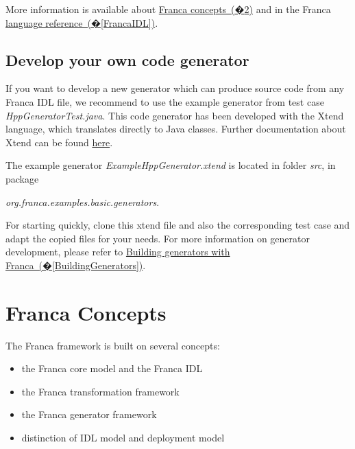 \documentclass[a4paper,10pt]{scrreprt}
\newlength{\XdocItemIndent}
\begin{document}
More information is available about \hyperref[FrancaConcepts]{Franca concepts~(�\ref*{FrancaConcepts})}
and in the Franca \hyperref[FrancaIDL]{language reference~(�\ref*{FrancaIDL})}.

\section{Develop your own code generator}
\label{GettingStarted_DevelopCodegenerator}
If you want to develop a new generator which can produce source code from any 
Franca IDL file, we recommend to use the example generator from test case
\textit{HppGeneratorTest.java}. This code generator has been developed with the 
Xtend language, which translates directly to Java classes.
Further documentation about Xtend can be found \href{http://www.xtend-lang.org}{here}.

The example generator \textit{ExampleHppGenerator.xtend} is located in folder \textit{src},
in package

\textit{org.franca.examples.basic.generators}.

For starting quickly, clone this xtend file and also the corresponding test case
and adapt the copied files for your needs.
For more information on generator development, please refer to
\hyperref[BuildingGenerators]{Building generators with Franca~(�\ref*{BuildingGenerators})}.


\chapter{Franca Concepts}
\label{FrancaConcepts}
The Franca framework is built on several concepts:
\setlength{\XdocItemIndent}{\textwidth}
\begin{itemize}
\addtolength{\XdocItemIndent}{-2.5em}
\item \begin{minipage}[t]{\XdocItemIndent}
the Franca core model and the Franca IDL

\end{minipage}
\item \begin{minipage}[t]{\XdocItemIndent}
the Franca transformation framework

\end{minipage}
\item \begin{minipage}[t]{\XdocItemIndent}
the Franca generator framework

\end{minipage}
\item \begin{minipage}[t]{\XdocItemIndent}
distinction of IDL model and deployment model

\end{minipage}
\end{itemize}
\addtolength{\XdocItemIndent}{2.5em}
\end{document}
